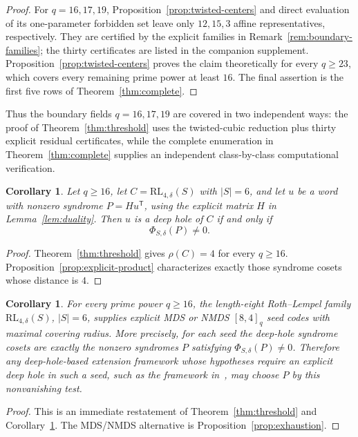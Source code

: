 ﻿\documentclass[11pt]{article}
\newcommand{\RL}{\mathrm{RL}}
\theoremstyle{plain}
\newtheorem{corollary}[theorem]{Corollary}
\theoremstyle{definition}
\begin{document}
\begin{proof}
For \(q=16,17,19\), Proposition~\ref{prop:twisted-centers} and direct
evaluation of its one-parameter forbidden set leave only \(12,15,3\)
affine representatives, respectively.  They are certified by the explicit
families in Remark~\ref{rem:boundary-families}; the thirty certificates are
listed in the companion supplement.  Proposition~\ref{prop:twisted-centers}
proves the claim theoretically for every \(q\ge23\), which covers every
remaining prime power at least \(16\).  The final assertion is the first
five rows of Theorem~\ref{thm:complete}.
\end{proof}

Thus the boundary fields \(q=16,17,19\) are covered in two independent
ways: the proof of Theorem~\ref{thm:threshold} uses the twisted-cubic
reduction plus thirty explicit residual certificates, while the complete
enumeration in Theorem~\ref{thm:complete} supplies an independent
class-by-class computational verification.

\begin{corollary}
\label{cor:explicit-deepholes}
Let \(q\ge16\), let \(C=\RL_{4,\delta}(S)\) with \(|S|=6\), and let \(u\)
be a word with nonzero syndrome \(P=Hu^{\mathsf T}\), using the explicit
matrix \(H\) in Lemma~\ref{lem:duality}.  Then \(u\) is a deep hole
of \(C\) if and only if
\[
  \Phi_{S,\delta}(P)\ne0.
\]
\end{corollary}

\begin{proof}
Theorem~\ref{thm:threshold} gives \(\rho(C)=4\) for every \(q\ge16\).
Proposition~\ref{prop:explicit-product} characterizes exactly those
syndrome cosets whose distance is \(4\).
\end{proof}

\begin{corollary}\label{cor:seed-codes}
For every prime power \(q\ge16\), the length-eight Roth--Lempel family
\(\RL_{4,\delta}(S)\), \(|S|=6\), supplies explicit MDS or NMDS
\([8,4]_q\) seed codes with maximal covering radius.  More precisely, for
each seed the deep-hole syndrome cosets are exactly the nonzero syndromes
\(P\) satisfying \(\Phi_{S,\delta}(P)\ne0\).  Therefore any
deep-hole-based extension framework whose hypotheses require an explicit
deep hole in such a seed, such as the framework
in~\cite{LiLuLingLam2026}, may choose \(P\) by this nonvanishing test.
\end{corollary}

\begin{proof}
This is an immediate restatement of Theorem~\ref{thm:threshold} and
Corollary~\ref{cor:explicit-deepholes}.  The MDS/NMDS alternative is
Proposition~\ref{prop:exhaustion}.
\end{proof}
\end{document}
